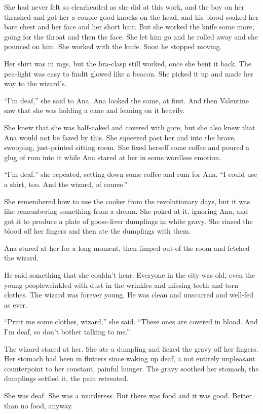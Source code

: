 She had never felt so clearheaded as she did at this work, and the
boy on her thrashed and got her a couple good knocks on the head,
and his blood soaked her bare chest and her face and her short
hair. But she worked the knife some more, going for the throat and
then the face. She let him go and he rolled away and she pounced on
him. She worked with the knife. Soon he stopped moving.

Her shirt was in rags, but the bra-clasp still worked, once she
bent it back. The pea-light was easy to find\dash{}it glowed like a
beacon. She picked it up and made her way to the wizard’s.

“I’m deaf,” she said to Ana. Ana looked the same, at first. And
then Valentine saw that she was holding a cane and leaning on it
heavily.

She knew that she was half-naked and covered with gore, but she
also knew that Ana would not be fazed by this. She squeezed past
her and into the brave, swooping, just-printed sitting room. She
fixed herself some coffee and poured a glug of rum into it while
Ana stared at her in some wordless emotion.

“I’m deaf,” she repeated, setting down some coffee and rum for Ana.
“I could use a shirt, too. And the wizard, of course.”

She remembered how to use the cooker from the revolutionary days,
but it was like remembering something from a dream. She poked at
it, ignoring Ana, and got it to produce a plate of goose-liver
dumplings in white gravy. She rinsed the blood off her fingers and
then ate the dumplings with them.

Ana stared at her for a long moment, then limped out of the room
and fetched the wizard.

He said something that she couldn’t hear. Everyone in the city was
old, even the young people\dash{}wrinkled with dust in the wrinkles and
missing teeth and torn clothes. The wizard was forever young. He
was clean and unscarred and well-fed as ever.

“Print me some clothes, wizard,” she said. “These ones are covered
in blood. And I’m deaf, so don’t bother talking to me.”

The wizard stared at her. She ate a dumpling and licked the gravy
off her fingers. Her stomach had been in flutters since waking up
deaf, a not entirely unpleasant counterpoint to her constant,
painful hunger. The gravy soothed her stomach, the dumplings
settled it, the pain retreated.

She was deaf. She was a murderess. But there was food and it was
good. Better than no food, anyway.

